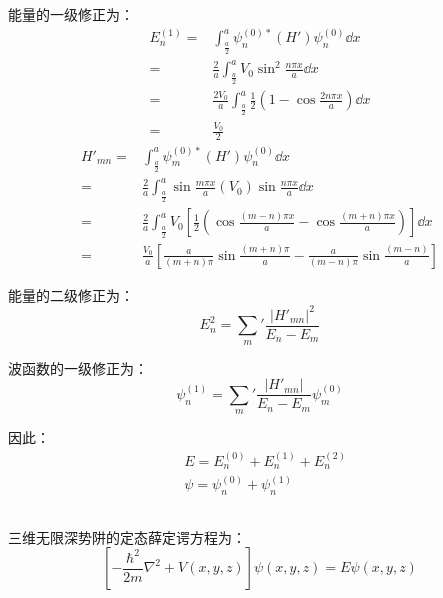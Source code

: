 能量的一级修正为：\\
\begin{equation}
\begin{aligned}
E^{(1)}_{n} =& \int^{a}_{\frac{a}{2}} \psi^{(0)*}_{n} (H') \psi^{(0)}_{n} \dd{x} \\
=& \frac{2}{a} \int^{a}_{\frac{a}{2}} V_{0} \sin^{2}{\frac{n \pi x}{a}} \dd{x} \\
=& \frac{2V_{0}}{a} \int^{a}_{\frac{a}{2}} \frac{1}{2} (1-\cos{\frac{2n \pi x}{a}}) \dd{x} \\
=& \frac{V_{0}}{2}
\end{aligned}
\end{equation}
\begin{equation}
\begin{aligned}
H'_{mn} =& \int^{a}_{\frac{a}{2}} \psi^{(0)*}_{m}(H') \psi^{(0)}_{n} \dd{x} \\
=& \frac{2}{a} \int^{a}_{\frac{a}{2}} \sin{\frac{m \pi x}{a}} (V_{0}) \sin{\frac{n \pi x}{a}} \dd{x} \\
=& \frac{2}{a} \int^{a}_{\frac{a}{2}} V_{0} \left[ \frac{1}{2} (\cos{\frac{(m-n) \pi x}{a}} - \cos{\frac{(m+n) \pi x}{a}}) \right] \dd{x} \\
=& \frac{V_{0}}{a} \left[ \frac{a}{(m+n)\pi} \sin{\frac{(m+n)\pi}{a}} - \frac{a}{(m-n)\pi} \sin{\frac{(m-n)}{a}} \right]
\end{aligned}
\end{equation}

能量的二级修正为：\\
\begin{equation}
E^{2}_{n} = \sum_{m}' \frac{\left| H'_{mn} \right|^{2}}{E_{n} - E_{m}}
\end{equation}

波函数的一级修正为：\\
\begin{equation}
\psi^{(1)}_{n} = \sum_{m}' \frac{\left| H'_{mn} \right|}{E_{n} - E_{m}} \psi^{(0)}_{m}
\end{equation}

因此：\\
\begin{equation}
\begin{aligned}
& E = E^{(0)}_{n} + E^{(1)}_{n} + E^{(2)}_{n} \\
& \psi = \psi^{(0)}_{n} + \psi^{(1)}_{n}
\end{aligned}
\end{equation}


\subsection{ }
三维无限深势阱的定态薛定谔方程为：\\
\begin{equation}
\left[ -\frac{\hbar^{2}}{2m} \nabla^{2} +V(x,y,z) \right]\psi(x,y,z) = E\psi(x,y,z)
\end{equation}

